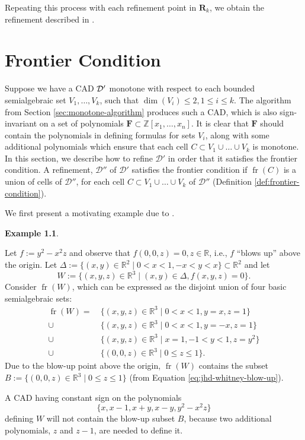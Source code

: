 \documentclass[
]{book}
\theoremstyle{definition}
\theoremstyle{definition}
\newtheorem{example}{Example}[chapter]
\theoremstyle{definition}
\theoremstyle{definition}
\theoremstyle{remark}
\begin{document}
Repeating this process with each refinement point in \(\mathbf{R}_k\), we obtain the refinement described in \citep[Lemma 3.11]{bgv15}.

\hypertarget{sec:frontier}{%
\chapter{Frontier Condition}\label{sec:frontier}}

Suppose we have a CAD \(\cal D'\) monotone with respect to each bounded semialgebraic set \(V_1,\ldots,V_k\), such that \(\dim(V_i) \le 2, 1 \le i \le k\).
The algorithm from Section \ref{sec:monotone-algorithm} produces such a CAD, which is also sign-invariant on a set of
polynomials \(\mathbf{F} \subset \mathbb{Z}[x_1,\ldots,x_n]\). It is clear that \(\mathbf{F}\) should contain the polynomials in
defining formulas for sets \(V_i\), along with some additional polynomials which ensure that each cell \(C \subset V_1 \cup \ldots \cup V_k\) is monotone.
In this section, we describe how to refine \(\mathcal{D'}\) in order that it satisfies the frontier condition. A refinement, \(\mathcal{D''}\) of \(\mathcal{D'}\) satisfies the frontier condition if \({\operatorname{fr} \left( C \right)}\) is a union of cells of \(\mathcal{D''}\), for each cell \(C \subset V_1 \cup \ldots \cup V_k\) of \(\mathcal{D''}\) (Definition \ref{def:frontier-condition}).

We first present a motivating example due to \citet{jhd20}.

\begin{example}
\protect\hypertarget{exm:whitney-jhd}{}\label{exm:whitney-jhd}\citep[Example 2.1]{jhd20}

Let \(f := y^2 - x^2 z\) and observe that \(f(0,0,z) = 0, z \in \mathbb{R}\), i.e., \(f\) ``blows up'' above the origin. Let \(\Delta := \{(x,y) \in \mathbb{R}^2 \mid 0 < x < 1, -x < y < x \} \subset \mathbb{R}^2\) and let
\[
W := \{ (x,y,z) \in \mathbb{R}^3 \mid (x,y) \in \Delta, f(x,y,z) = 0 \}.
\]
Consider \({\operatorname{fr} \left( W \right)}\), which can be expressed as the disjoint union of four basic semialgebraic sets:
\begin{align}
{\operatorname{fr} \left( W \right)} =&\ \{ (x,y,z) \in \mathbb{R}^3 \mid 0 < x < 1, y = x, z = 1 \} \\
\cup&\ \{ (x,y,z) \in \mathbb{R}^3 \mid 0 < x < 1, y = -x, z = 1 \} \\
\cup&\ \{ (x,y,z) \in \mathbb{R}^3 \mid x = 1, -1 < y < 1, z = y^2 \} \\
\cup&\ \{ (0,0,z) \in \mathbb{R}^3 \mid 0 \le z \le 1 \}.
\label{eq:jhd-whitney-blow-up}
\end{align}
Due to the blow-up point above the origin, \({\operatorname{fr} \left( W \right)}\) contains the subset \(B := \{ (0,0,z) \in \mathbb{R}^3 \mid 0 \le z \le 1 \}\) (from Equation \eqref{eq:jhd-whitney-blow-up}).

A CAD having constant sign on the polynomials
\[
\{ x, x - 1, x + y, x - y, y^2 - x^2 z \}
\] defining \(W\) will not contain the blow-up subset \(B\), because two additional polynomials, \(z\) and \(z-1\), are needed to define it.
\end{example}
\end{document}
